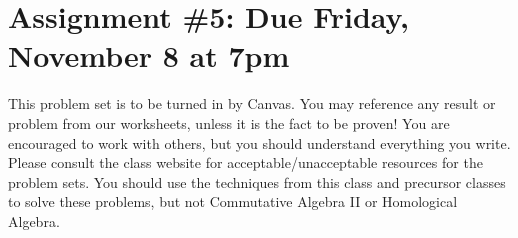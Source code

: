 \documentclass[12pt]{amsart}
\newcommand{\showsol}[1]{\def\displaysol{#1}}
\begin{document}
\showsol{1}
	
	\thispagestyle{empty}
	
	\section*{Assignment \#5: Due Friday, November 8 at 7pm}
	
	This problem set is to be turned in by Canvas. You may reference any result or problem from our worksheets, unless it is the fact to be proven! You are encouraged to work with others, but you should understand everything you write. Please consult the class website for acceptable/unacceptable resources for the problem sets. You should use the techniques from this class and precursor classes to solve these problems, but not Commutative Algebra II or Homological Algebra.
	
	
	\
	
\end{document}

